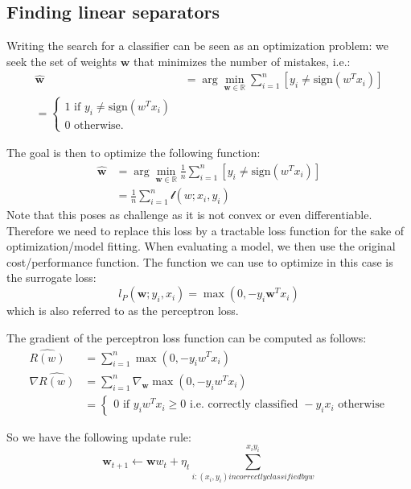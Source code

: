 \documentclass[a4paper,10pt,twoside]{article}
\begin{document}
\subsection{Finding linear separators}

Writing the search for a classifier can be seen as an optimization problem:
we seek the set of weights $\mathbf{w}$ that minimizes the number of mistakes, i.e.:
\begin{align*}
    \hat{\mathbf{w}} &= \arg\min_{\mathbf{w}\in\mathbb{R}}\sum_{i=1}^{n}[y_i\neq \text{sign}(w^Tx_i)]\\
    =\begin{cases}
        1\text{ if } y_i\neq \text{sign}(w^Tx_i)\\
        0\text{ otherwise.}
    \end{cases}
\end{align*}

The goal is then to optimize the following function:
\begin{align*}
    \hat{\mathbf{w}} &= \arg\min_{\mathbf{w}\in\mathbb{R}}\frac{1}{n}\sum_{i=1}^{n}[y_i\neq \text{sign}(w^Tx_i)]\\
    &= \frac{1}{n}\sum_{i=1}^{n}\mathcal{l}(w; x_i,y_i)
\end{align*}
Note that this poses as challenge as it is not convex or even differentiable. Therefore we need to replace this loss by a tractable loss function for the sake of optimization/model fitting. When evaluating a model, we then use the original cost/performance function. The function we can use to optimize in this case is the surrogate loss:
\begin{equation*}
    l_P(\mathbf{w}; y_i, x_i) = \max (0, -y_i\mathbf{w}^Tx_i)
\end{equation*}
which is also referred to as the perceptron loss.

The gradient of the perceptron loss function can be computed as follows:
\begin{align*}
    \hat{R(w)}&=\sum_{i=1}^{n}\max (0, -y_iw^Tx_i)\\
    \nabla\hat{R(w)}&=\sum_{i=1}^{n}\nabla_{\mathbf{w}}\max (0, -y_iw^Tx_i)\\
    &=\begin{cases}
        0\text{ if } y_iw^Tx_i\geq 0 \text{ i.e. correctly classified }
        -y_ix_i\text{ otherwise} 
    \end{cases}
\end{align*}

So we have the following update rule:
\begin{equation*}
    \mathbf{w}_{t+1} \leftarrow \mathbf{w}w_t+\eta_t\sum_{i:(x_i,y_i) {incorrectly classified by} w}^{x_iy_i}
\end{equation*}
\end{document}
